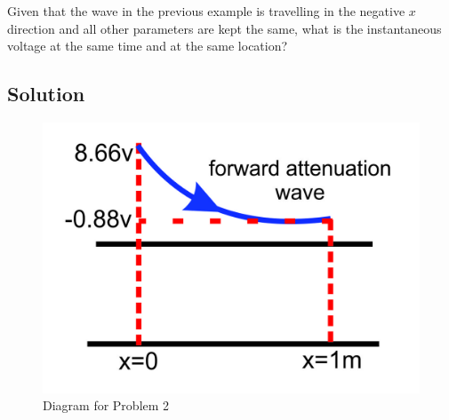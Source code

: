 \begin{exmp}
Given that the wave in the previous example is travelling in the negative ${x}$ direction and all other parameters are kept the same, what is the instantaneous voltage at the same time and at the same location?

\subsection*{Solution}
\begin{figure}[h]
\centering
\includegraphics[scale=0.5]{./graphics/Group98}
\caption{Diagram for Problem 2}
\label{fig:group98}
\end{figure}


\end{exmp}
